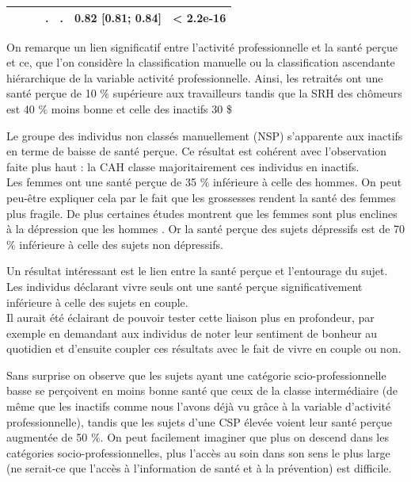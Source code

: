 \documentclass{book}
\begin{document}
\begin{longtable}{lcccc}
 $\qquad$ & .  & .  &0.82 [0.81;  0.84] &  < 2.2e-16 \\ 
    \hline
    \end{longtable} 

\bigskip

\noindent
On remarque un lien significatif entre l'activité professionnelle et la santé perçue et ce, que l'on considère la classification manuelle ou la classification ascendante hiérarchique de la variable activité professionnelle. Ainsi, les retraités ont une santé perçue de 10 $\%$ supérieure aux travailleurs tandis que la SRH des chômeurs est 40 $\%$ moins bonne et celle des inactifs 30 \$%

\noindent
Le groupe des individus non classés manuellement (NSP) s'apparente aux inactifs en terme de baisse de santé perçue. Ce résultat est cohérent avec l'observation faite plus haut : la CAH classe majoritairement ces individus en inactifs.\\
\bigskip
\noindent
Les femmes ont une santé perçue de 35 $\%$ inférieure à celle des hommes. On peut peu-être expliquer cela par le fait que les grossesses rendent la santé des femmes plus fragile. De plus certaines études montrent que les femmes sont plus enclines à la dépression que les hommes \cite{nolen2001gender}. Or la santé perçue des sujets dépressifs est de 70 $\%$ inférieure à celle des sujets non dépressifs.\\
\bigskip

\noindent
Un résultat intéressant est le lien entre la santé perçue et l'entourage du sujet. Les individus déclarant vivre seuls ont une santé perçue significativement inférieure à celle des sujets en couple.\\ Il aurait été éclairant de pouvoir tester cette liaison plus en profondeur, par exemple en demandant aux individus de noter leur sentiment de bonheur au quotidien et d'ensuite coupler ces résultats avec le fait de vivre en couple ou non.\\
\bigskip

\noindent
Sans surprise on observe que les sujets ayant une catégorie scio-professionnelle basse se perçoivent en moins bonne santé que ceux de la classe intermédiaire (de même que les inactifs comme nous l'avons déjà vu grâce à la variable d'activité professionnelle), tandis que les sujets d'une CSP élevée voient leur santé perçue augmentée de 50 $\%$. On peut facilement imaginer que plus on descend dans les catégories socio-professionnelles, plus l'accès au soin dans son sens le plus large (ne serait-ce que l'accès à l'information de santé et à la prévention) est difficile.\\
\bigskip
\end{document}
